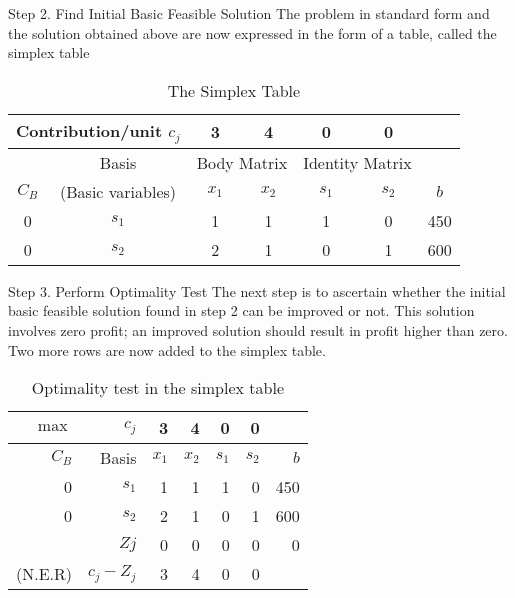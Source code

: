\begin{frame}{Step 2. Find Initial Basic Feasible Solution}
  The problem in standard form and the solution obtained above are now expressed in the form of a table, called the simplex table

  \begin{table}[h]
    \centering
    \caption{The Simplex Table}    \label{tab:simplex-table}
    \begin{tabular}{ccccccc}
      \toprule
      \multicolumn{2}{c}{Contribution/unit $c_j$}  &3 &4 &0 &0 & \\
      \midrule
                                                   &Basis&\multicolumn{2}{c}{Body Matrix}&\multicolumn{2}{c}{Identity Matrix}&\\
      \cmidrule{3-6}
      $C_B$ &(Basic variables)&$x_1$&$x_2$&$s_1$&$s_2$&$b$\\
      \midrule
      0&$s_1$&1&1&1&0&450\\
      0&$s_2$&2&1&0&1&600\\
      \bottomrule
    \end{tabular}
  \end{table}
\end{frame}

\begin{frame}{Step 3. Perform Optimality Test}
  The next step is to ascertain whether the initial basic feasible solution found in step 2 can be improved or not. This solution involves zero profit; an improved solution should result in profit higher than zero. \alert{Two more rows are now added to the simplex table}.

  \begin{table}[h]
    \centering
    \caption{Optimality test in the simplex table}    \label{tab:simplex-table-optimalitytest}
    \begin{tabular}{rrrrrrr}
      \toprule
      $\max$& $c_j$  &3 &4 &0 &0 & \\
      \midrule
      $C_B$ &Basis&$x_1$&$x_2$&$s_1$&$s_2$&$b$\\
      \midrule
      0&$s_1$&1&1&1&0&450\\
      0&$s_2$&2&1&0&1&600\\
      \midrule
      &$Zj$&0&0&0&0&0\\
      (N.E.R)&$c_j - Z_j$&3&4&0&0&\\
      \bottomrule
    \end{tabular}
  \end{table}
\end{frame}

